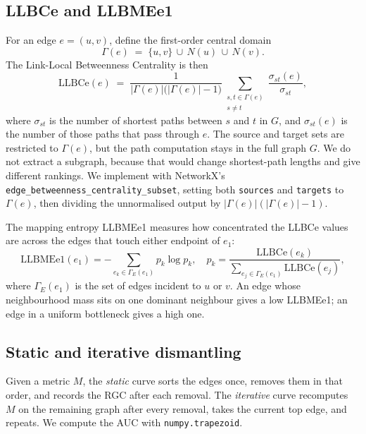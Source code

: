 \documentclass[11pt,a4paper]{article}
\begin{document}
\subsection{LLBCe and LLBMEe1}
For an edge $e = (u,v)$, define the first-order central domain
\begin{equation}
\Gamma(e) \;=\; \{u, v\} \,\cup\, N(u) \,\cup\, N(v).
\end{equation}
The Link-Local Betweenness Centrality is then
\begin{equation}
\text{LLBCe}(e) \;=\; \frac{1}{|\Gamma(e)|\bigl(|\Gamma(e)| - 1\bigr)}
\sum_{\substack{s,t \in \Gamma(e) \\ s \ne t}}
\frac{\sigma_{st}(e)}{\sigma_{st}},
\label{eq:llbce}
\end{equation}
where $\sigma_{st}$ is the number of shortest paths between $s$ and $t$
in $G$, and $\sigma_{st}(e)$ is the number of those paths that pass
through $e$. The source and target sets are restricted to $\Gamma(e)$,
but the path computation stays in the full graph $G$. We do not extract
a subgraph, because that would change shortest-path lengths and give
different rankings. We implement  with NetworkX's
\texttt{edge\_betweenness\_centrality\_subset}, setting both
\texttt{sources} and \texttt{targets} to $\Gamma(e)$, then dividing the
unnormalised output by $|\Gamma(e)|(|\Gamma(e)|{-}1)$.

The mapping entropy LLBMEe1 measures how concentrated the LLBCe values
are across the edges that touch either endpoint of $e_1$:
\begin{equation}
\text{LLBMEe1}(e_1) = -\sum_{e_k \in \Gamma_E(e_1)}
p_k \log p_k,
\quad
p_k = \frac{\text{LLBCe}(e_k)}{\sum_{e_j \in \Gamma_E(e_1)} \text{LLBCe}(e_j)},
\label{eq:llbme}
\end{equation}
where $\Gamma_E(e_1)$ is the set of edges incident to $u$ or $v$. An
edge whose neighbourhood mass sits on one dominant neighbour gives a low
LLBMEe1; an edge in a uniform bottleneck gives a high one.

\subsection{Static and iterative dismantling}
Given a metric $M$, the \emph{static} curve sorts the edges once, removes
them in that order, and records the RGC after each removal. The
\emph{iterative} curve recomputes $M$ on the remaining graph after every
removal, takes the current top edge, and repeats. We compute the AUC with
\texttt{numpy.trapezoid}.
\end{document}
